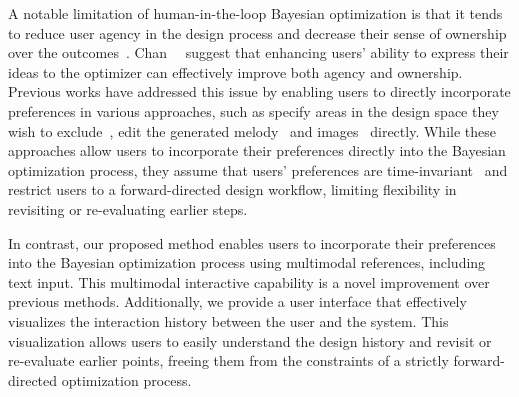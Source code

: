A notable limitation of human-in-the-loop Bayesian optimization is that it tends to reduce user agency in the design process and decrease their sense of ownership over the outcomes~\cite{Chan2022}.
Chan~\etal~\cite{Chan2022} suggest that enhancing users' ability to express their ideas to the optimizer can effectively improve both agency and ownership.
Previous works have addressed this issue by enabling users to directly incorporate preferences in various approaches, such as specify areas in the design space they wish to exclude~\cite{Mo2024}, edit the generated melody~\cite{ZhouGenerativeMelody2020} and images~\cite{chong2021interactive} directly.
While these approaches allow users to incorporate their preferences directly into the Bayesian optimization process, they assume that users' preferences are time-invariant~\cite{KoyamaGallery2020} and restrict users to a forward-directed design workflow, limiting flexibility in revisiting or re-evaluating earlier steps.

In contrast, our proposed method enables users to incorporate their preferences into the Bayesian optimization process using multimodal references, including text input.
This multimodal interactive capability is a novel improvement over previous methods.
Additionally, we provide a user interface that effectively visualizes the interaction history between the user and the system. 
This visualization allows users to easily understand the design history and revisit or re-evaluate earlier points, freeing them from the constraints of a strictly forward-directed optimization process.
